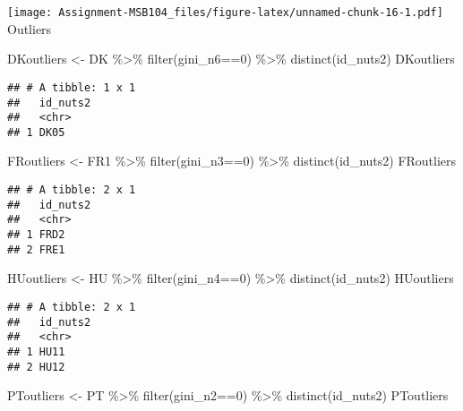 \documentclass[
]{article}
\newenvironment{Shaded}{\begin{snugshade}}{\end{snugshade}}
\newcommand{\DecValTok}[1]{\textcolor[rgb]{0.00,0.00,0.81}{#1}}
\newcommand{\FunctionTok}[1]{\textcolor[rgb]{0.00,0.00,0.00}{#1}}
\newcommand{\NormalTok}[1]{#1}
\newcommand{\OtherTok}[1]{\textcolor[rgb]{0.56,0.35,0.01}{#1}}
\newcommand{\SpecialCharTok}[1]{\textcolor[rgb]{0.00,0.00,0.00}{#1}}
\begin{document}
\texttt{[image: Assignment-MSB104\_files/figure-latex/unnamed-chunk-16-1.pdf]}
Outliers

\begin{Shaded}
\begin{Highlighting}[]
\NormalTok{DKoutliers }\OtherTok{\textless{}{-}}\NormalTok{ DK }\SpecialCharTok{\%\textgreater{}\%}
  \FunctionTok{filter}\NormalTok{(gini\_n6}\SpecialCharTok{==}\DecValTok{0}\NormalTok{) }\SpecialCharTok{\%\textgreater{}\%}
  \FunctionTok{distinct}\NormalTok{(id\_nuts2)}
\NormalTok{DKoutliers}
\end{Highlighting}
\end{Shaded}

\begin{verbatim}
## # A tibble: 1 x 1
##   id_nuts2
##   <chr>   
## 1 DK05
\end{verbatim}

\begin{Shaded}
\begin{Highlighting}[]
\NormalTok{FRoutliers }\OtherTok{\textless{}{-}}\NormalTok{ FR1 }\SpecialCharTok{\%\textgreater{}\%}
  \FunctionTok{filter}\NormalTok{(gini\_n3}\SpecialCharTok{==}\DecValTok{0}\NormalTok{) }\SpecialCharTok{\%\textgreater{}\%}
  \FunctionTok{distinct}\NormalTok{(id\_nuts2)}
\NormalTok{FRoutliers}
\end{Highlighting}
\end{Shaded}

\begin{verbatim}
## # A tibble: 2 x 1
##   id_nuts2
##   <chr>   
## 1 FRD2    
## 2 FRE1
\end{verbatim}

\begin{Shaded}
\begin{Highlighting}[]
\NormalTok{HUoutliers }\OtherTok{\textless{}{-}}\NormalTok{ HU }\SpecialCharTok{\%\textgreater{}\%}
  \FunctionTok{filter}\NormalTok{(gini\_n4}\SpecialCharTok{==}\DecValTok{0}\NormalTok{) }\SpecialCharTok{\%\textgreater{}\%}
  \FunctionTok{distinct}\NormalTok{(id\_nuts2)}
\NormalTok{HUoutliers}
\end{Highlighting}
\end{Shaded}

\begin{verbatim}
## # A tibble: 2 x 1
##   id_nuts2
##   <chr>   
## 1 HU11    
## 2 HU12
\end{verbatim}

\begin{Shaded}
\begin{Highlighting}[]
\NormalTok{PToutliers }\OtherTok{\textless{}{-}}\NormalTok{ PT }\SpecialCharTok{\%\textgreater{}\%}
  \FunctionTok{filter}\NormalTok{(gini\_n2}\SpecialCharTok{==}\DecValTok{0}\NormalTok{) }\SpecialCharTok{\%\textgreater{}\%}
  \FunctionTok{distinct}\NormalTok{(id\_nuts2)}
\NormalTok{PToutliers}
\end{Highlighting}
\end{Shaded}
\end{document}
